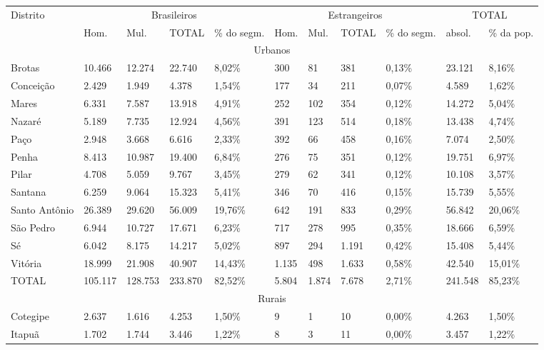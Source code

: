 \begin{table}[!htp]
{
\begin{tiny}
\begin{tabular}{m{1.3cm} m{1cm} m{1cm} m{1.1cm}  m{1cm} m{0.7cm} m{0.7cm} m{1.1cm} m{1cm} m{1cm} m{1cm} }
\hline
\multirow{2}{*}{Distrito} & \multicolumn{4}{c}{Brasileiros} & \multicolumn{4}{c}{Estrangeiros} & \multicolumn{2}{c}{TOTAL} \\
\cline{2-11}	&Hom.	&Mul.	&TOTAL	&\% do segm.	&Hom.	&Mul. 	&TOTAL	&\% do segm.	&absol.	& \% da pop. \\
\hline
\multicolumn{11}{c}{Urbanos}	\\
\hline
Brotas	&10.466	&12.274	&22.740	&8,02\%	&300	&81	&381	&0,13\%	&23.121	&8,16\% \\
Conceição	&2.429	&1.949	&4.378	&1,54\%	&177	&34	&211	&0,07\%	&4.589	&1,62\% \\
Mares	&6.331	&7.587	&13.918	&4,91\%	&252	&102	&354	&0,12\%	&14.272	&5,04\% \\
Nazaré	&5.189	&7.735	&12.924	&4,56\%	&391	&123	&514	&0,18\%	&13.438	&4,74\% \\
Paço	&2.948	&3.668	&6.616	&2,33\%	&392	&66	&458	&0,16\%	&7.074	&2,50\% \\
Penha	&8.413	&10.987	&19.400	&6,84\%	&276	&75	&351	&0,12\%	&19.751	&6,97\% \\
Pilar	&4.708	&5.059	&9.767	&3,45\%	&279	&62	&341	&0,12\%	&10.108	&3,57\% \\
Santana	&6.259	&9.064	&15.323	&5,41\%	&346	&70	&416	&0,15\%	&15.739	&5,55\% \\
Santo Antônio	&26.389	&29.620	&56.009	&19,76\%	&642	&191	&833	&0,29\%	&56.842	&20,06\% \\
São Pedro	&6.944	&10.727	&17.671	&6,23\%	&717	&278	&995	&0,35\%	&18.666	&6,59\% \\
Sé	&6.042	&8.175	&14.217	&5,02\%	&897	&294	&1.191	&0,42\%	&15.408	&5,44\% \\
Vitória	&18.999	&21.908	&40.907	&14,43\%	&1.135	&498	&1.633	&0,58\%	&42.540	&15,01\% \\
TOTAL	&105.117	&128.753	&233.870	&82,52\%	&5.804	&1.874	&7.678	&2,71\%	&241.548	&85,23\% \\
\hline
\multicolumn{11}{c}{Rurais}	\\
\hline
Cotegipe	&2.637	&1.616	&4.253	&1,50\%	&9	&1	&10	&0,00\%	&4.263	&1,50\% \\
Itapuã	&1.702	&1.744	&3.446	&1,22\%	&8	&3	&11	&0,00\%	&3.457	&1,22\% \\

\end{tabular}
\end{tiny}}
\end{table}
